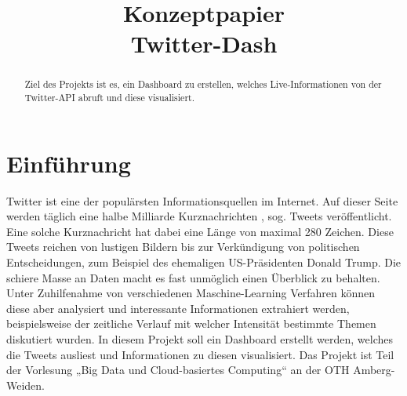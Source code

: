 \documentclass[conference]{IEEEtran}
\begin{document}
\title{Konzeptpapier\\Twitter-Dash}

\author{
        \and

        \and

        \and

        \and

        \and

}

\maketitle

\begin{abstract}
        Ziel des Projekts ist es, ein Dashboard zu erstellen, welches Live-Informationen von der Twitter-API abruft und diese visualisiert.
\end{abstract}


\section{Einführung}

Twitter ist eine der populärsten Informationsquellen im Internet.
Auf dieser Seite werden täglich eine halbe Milliarde Kurznachrichten \cite{Tweetstatistiken}, sog. Tweets veröffentlicht.
Eine solche Kurznachricht hat dabei eine Länge von maximal 280 Zeichen.
Diese Tweets reichen von lustigen Bildern bis zur Verkündigung von politischen Entscheidungen, zum Beispiel des ehemaligen US-Präsidenten Donald Trump.
Die schiere Masse an Daten macht es fast unmöglich einen Überblick zu behalten.
Unter Zuhilfenahme von verschiedenen Maschine-Learning Verfahren können diese aber analysiert und interessante Informationen extrahiert werden, beispielsweise der zeitliche Verlauf mit welcher Intensität bestimmte Themen diskutiert wurden.
In diesem Projekt soll ein Dashboard erstellt werden, welches die Tweets ausliest und Informationen zu diesen visualisiert.
Das Projekt ist Teil der Vorlesung „Big Data und Cloud-basiertes Computing“ an der OTH Amberg-Weiden.
\end{document}

